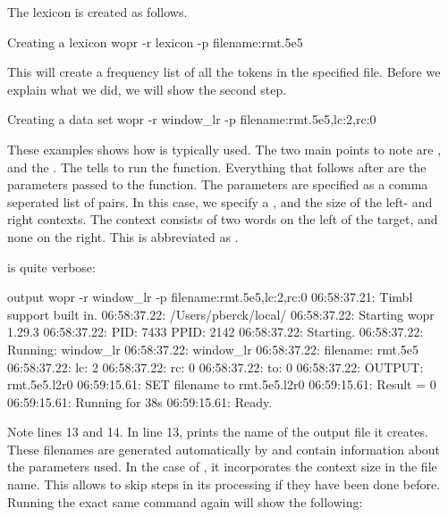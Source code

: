 \documentclass[a4paper,10pt,twoside]{report}
\begin{document}
The lexicon is created as follows.

\begin{bash}{Creating a lexicon}
wopr -r lexicon -p filename:rmt.5e5
\end{bash}

This will create a frequency list of all the tokens in the specified
file. Before we explain what we did, we will show the second step.

\begin{bash}{Creating a data set}
wopr -r window_lr -p filename:rmt.5e5,lc:2,rc:0
\end{bash}

These examples shows how \wopr{} is typically used. The two main
points to note are , and the . The
 tells \wopr{} to run the 
function. Everything that follows after  are the parameters
passed to the function. The parameters are specified as a comma
seperated list of  pairs. In this case, we specify
a ,  and the size of the left- and right
contexts. The context consists of two words on the left of the target,
and none on the right. This is abbreviated as .

\Wopr{} is quite verbose:

\begin{bash}{\Wopr{} output}
wopr -r window_lr -p filename:rmt.5e5,lc:2,rc:0
06:58:37.21: Timbl support built in.
06:58:37.22: /Users/pberck/local/
06:58:37.22: Starting wopr 1.29.3
06:58:37.22: PID:   7433 PPID:   2142
06:58:37.22: Starting.
06:58:37.22: Running: window_lr
06:58:37.22: window_lr
06:58:37.22:  filename:  rmt.5e5
06:58:37.22:  lc:        2
06:58:37.22:  rc:        0
06:58:37.22:  to:        0
06:58:37.22:  OUTPUT:    rmt.5e5.l2r0
06:59:15.61: SET filename to rmt.5e5.l2r0
06:59:15.61: Result = 0
06:59:15.61: Running for 38s
06:59:15.61: Ready.
\end{bash}

Note lines 13 and 14. In line 13, \wopr{} prints the name of the
output file it creates. These filenames are generated automatically by
\wopr{} and contain information about the parameters used. In the case
of , it incorporates the context size in the file
name. This allows \wopr{} to skip steps in its processing if they have
been done before. Running the exact same command again will show the
following:
\end{document}
